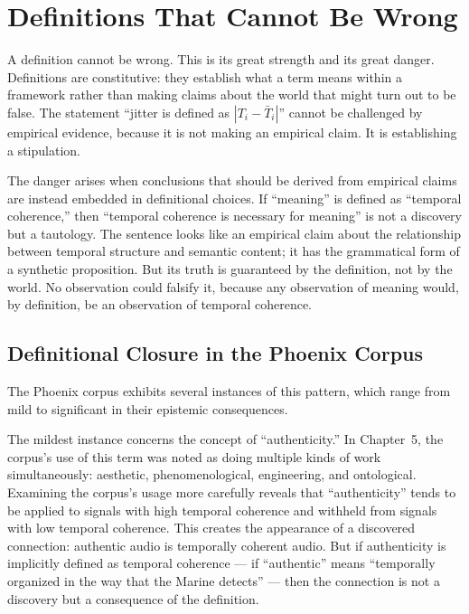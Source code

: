 
\chapter{Definitions That Cannot Be Wrong}
\label{ch:definitional-closure}


\noindent
A definition cannot be wrong. This is its great strength and
its great danger. Definitions are constitutive: they establish
what a term means within a framework rather than making claims
about the world that might turn out to be false. The statement
``jitter is defined as $|T_i - \bar{T}_i|$'' cannot be
challenged by empirical evidence, because it is not making
an empirical claim. It is establishing a stipulation.

The danger arises when conclusions that should be derived
from empirical claims are instead embedded in definitional
choices. If ``meaning'' is defined as ``temporal coherence,''
then ``temporal coherence is necessary for meaning'' is not
a discovery but a tautology. The sentence looks like an
empirical claim about the relationship between temporal
structure and semantic content; it has the grammatical
form of a synthetic proposition. But its truth is guaranteed
by the definition, not by the world. No observation could
falsify it, because any observation of meaning would, by
definition, be an observation of temporal coherence.

\section{Definitional Closure in the Phoenix Corpus}
\label{sec:closure-phoenix}

The Phoenix corpus exhibits several instances of this pattern,
which range from mild to significant in their epistemic
consequences.

The mildest instance concerns the concept of ``authenticity.''
In Chapter~5, the corpus's use of this term was noted as
doing multiple kinds of work simultaneously: aesthetic,
phenomenological, engineering, and ontological. Examining
the corpus's usage more carefully reveals that ``authenticity''
tends to be applied to signals with high temporal coherence
and withheld from signals with low temporal coherence. This
creates the appearance of a discovered connection: authentic
audio is temporally coherent audio. But if authenticity is
implicitly defined as temporal coherence --- if ``authentic''
means ``temporally organized in the way that the Marine
detects'' --- then the connection is not a discovery but
a consequence of the definition.

